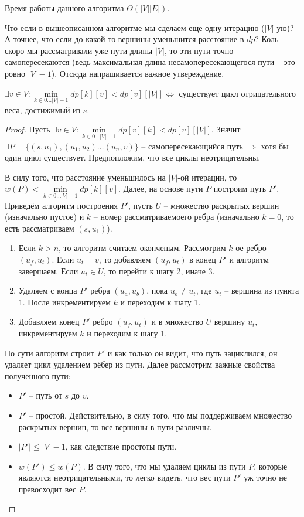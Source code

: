 Время работы данного алгоритма $\Theta(|V| |E|)$.

Что если в вышеописанном алгоритме мы сделаем еще одну итерацию ($|V|$-ую)? А точнее, что если до какой-то вершины уменьшится расстояние в $dp$? Коль скоро мы рассматривали уже пути длины $|V|$, то эти пути точно самопересекаются (ведь максимальная длина несамопересекающегося пути -- это ровно $|V| - 1$). Отсюда напрашивается важное утвереждение.


\Th $\exists v \in V: \min\limits_{k \in 0 \dots |V| - 1} dp[k][v] < dp[v][|V|] \iff$ существует цикл отрицательного веса, достижимый из $s$.

\begin{proof}
    Пусть $\exists v \in V: \min\limits_{k \in 0 \dots |V| - 1} dp[v][k] < dp[v][|V|]$. Значит $\exists P = \{(s, u_1), (u_1, u_2) \dots (u_n, v)\}$ -- самопересекающийся путь $\Rightarrow$ хотя бы один цикл существует. Предпопложим, что все циклы неотрицательны.

    В силу того, что расстояние уменьшилось на $|V|$-ой итерации, то $w(P) < \min\limits_{k \in 0 \dots |V| - 1} dp[k][v]$. Далее, на основе пути $P$ построим путь $P'$. Приведём алгоритм построения $P'$, пусть $U$ -- множество раскрытых вершин (изначально пустое) и $k$ -- номер рассматриваемоего ребра (изначально $k = 0$, то есть рассматриваем $(s, u_1)$).

    \begin{enumerate}
        \item Если $k > n$, то алгоритм считаем оконченым. Рассмотрим $k$-ое ребро $(u_f, u_t)$. Если $u_t = v$, то добавляем $(u_f, u_t)$ в конец $P'$ и алгоритм завершаем. Если $u_t \in U$, то перейти к шагу 2, иначе 3.
        \item Удаляем с конца $P'$ ребра $(u_a, u_b)$, пока $u_b \neq u_t$, где $u_t$ -- вершина из пункта 1. После инкрементируем $k$ и переходим к шагу 1.
        \item Добавляем конец $P'$ ребро $(u_f, u_t)$ и в множество $U$ вершину $u_t$, инкрементируем $k$ и переходим к шагу 1.
    \end{enumerate}

    По сути алгоритм строит $P'$ и как только он видит, что путь зациклился, он удаляет цикл удалением рёбер из пути. Далее рассмотрим важные свойства полученного пути:
    \begin{itemize}
        \item $P'$ -- путь от $s$ до $v$.
        \item $P'$ -- простой. Действительно, в силу того, что мы поддерживаем множество раскрытых вершин, то все вершины в пути различны.
        \item $|P'| \leq |V| - 1$, как следствие простоты пути.
        \item $w(P') \leq w(P)$. В силу того, что мы удаляем циклы из пути $P$, которые являются неотрицательными, то легко видеть, что вес пути $P'$ уж точно не превосходит вес $P$.
    \end{itemize}
    

\end{proof}
